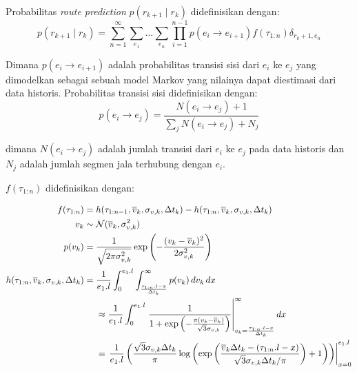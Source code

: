 Probabilitas \textit{route prediction} $p(r_{k+1}\mid r_k)$ didefinisikan dengan:
\begin{equation}
p(r_{k+1}\mid r_k)=\sum_{n=1}^{\infty}\sum_{e_1}\ldots\sum_{e_n}\prod_{i=1}^{n-1}p(e_i\rightarrow e_{i+1})f(\tau_{1:n})\delta_{r_k+1,e_n}  
\end{equation}

Dimana $p(e_i\rightarrow e_{i+1})$ adalah probabilitas transisi sisi dari $e_i$ ke $e_j$ yang dimodelkan sebagai sebuah model Markov yang nilainya dapat diestimasi dari data historis. Probabilitas transisi sisi didefinisikan dengan:
\begin{equation}
p(e_i\rightarrow e_j)=\frac{N(e_i\rightarrow e_j) + 1}{\sum_{j}N(e_i\rightarrow e_j)+N_j}
\end{equation}

dimana $N(e_i\rightarrow e_j)$ adalah jumlah transisi dari $e_i$ ke $e_j$ pada data historis dan $N_j$ adalah jumlah segmen jala terhubung dengan $e_i$.


$f(\tau_{1:n})$ didefinisikan dengan:

\begin{align}
    f(\tau_{1:n}) 
    &= h(\tau_{1:n-1},\overline{v}_k,\sigma_{v,k},\Delta t_k) 
    - h(\tau_{1:n},\overline{v}_k,\sigma_{v,k},\Delta t_k) \\
    v_k&\sim \mathcal{N}(\overline{v}_k,\sigma^2_{v,k})  \notag  \\
    p(v_k)
    &=\frac{1}{\sqrt{2\pi\sigma_{v,k}^2}}\exp\left(-\frac{(v_k-\overline{v}_k)^2}{2\sigma_{v,k}^2}\right)\\
    h(\tau_{1:n},\overline{v}_k,\sigma_{v,k},\Delta t_k) 
    &= \begin{aligned}[t]
        &\frac{1}{e_1.l}\int_0^{e_1.l}\int_{\frac{\tau_{1:n}.l - x}{\Delta t_k}}^{\infty} p(v_k)\,dv_k\,dx \\
        &\approx \frac{1}{e_1.l} \int_0^{e_1.l} 
        \left. \frac{1}{1+\exp \left(-\frac{\pi(v_k-\overline{v}_k)}{\sqrt{3}\sigma_{v,k}} \right)}\right|_{v_k=\frac{\tau_{1:n}.l - x}{\Delta t_k}}^{\infty} dx \\
        &= \left. \frac{1}{e_1.l} \left(\frac{\sqrt{3}\sigma_{v,k}\Delta t_k}{\pi} \log \left( \exp\left( \frac{\overline{v}_k\Delta t_k-(\tau_{1:n}.l - x)}{\sqrt{3}\sigma_{v,k}\Delta t_k/\pi} \right)+1 \right) \right) \right|_{x=0}^{e_1.l}
    \end{aligned}
\end{align}


